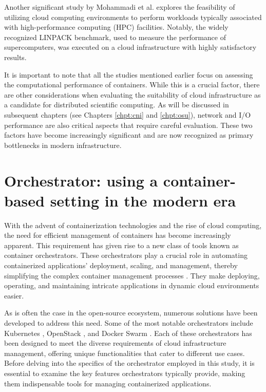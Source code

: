 Another significant study by Mohammadi et al. \cite{Mohammadi2018} explores the
feasibility of utilizing cloud computing environments to perform workloads
typically associated with high-performance computing (HPC) facilities.
Notably, the widely recognized LINPACK benchmark, used to measure the
performance of supercomputers, was executed on a cloud infrastructure with
highly satisfactory results.

It is important to note that all the studies mentioned earlier focus on
assessing the computational performance of containers. While this is a crucial
factor, there are other considerations when evaluating the suitability of cloud
infrastructure as a candidate for distributed scientific computing.
As will be discussed in subsequent chapters (see Chapters \ref{chpt:cni} and
\ref{chpt:osu}), network and I/O performance are also critical aspects that
require careful evaluation. These two factors have become increasingly
significant and are now recognized as primary bottlenecks in modern
infrastructure.

\section{Orchestrator: using a container-based setting in the modern era}\label{sec:chpt1-orchestrator}




With the advent of containerization technologies and the rise of cloud
computing, the need for efficient management of containers has become
increasingly apparent.
This requirement has given rise to a new class of tools known as container
orchestrators. These orchestrators play a crucial role in automating
containerized applications' deployment, scaling, and management, thereby
simplifying the complex container management processes \cite{Rodriguez2018}.
They make deploying, operating, and maintaining intricate applications in
dynamic cloud environments easier.

As is often the case in the open-source ecosystem, numerous solutions have been
developed to address this need.
Some of the most notable orchestrators include Kubernetes
\cite{bookofkubernetes}, OpenStack \cite{Lima2017}, and Docker Swarm
\cite{Singh2023}.
Each of these orchestrators has been designed to meet the diverse requirements
of cloud infrastructure management, offering unique functionalities that cater
to different use cases.
Before delving into the specifics of the orchestrator employed in this study, it
is essential to examine the key features orchestrators typically provide, making
them indispensable tools for managing containerized applications.

